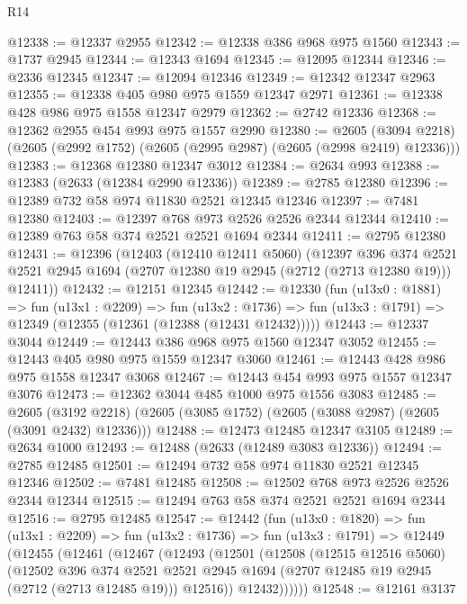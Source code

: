\begin{lexlean}{R14}
\begin{coremodule}
@12338 := @12337 @2955
@12342 := @12338 @386 @968 @975 @1560
@12343 := @1737 @2945
@12344 := @12343 @1694
@12345 := @12095 @12344
@12346 := @2336 @12345
@12347 := @12094 @12346
@12349 := @12342 @12347 @2963
@12355 := @12338 @405 @980 @975 @1559 @12347 @2971
@12361 := @12338 @428 @986 @975 @1558 @12347 @2979
@12362 := @2742 @12336
@12368 := @12362 @2955 @454 @993 @975 @1557 @2990
@12380 := @2605
    (@3094 @2218)
    (@2605 (@2992 @1752) (@2605 (@2995 @2987) (@2605 (@2998 @2419) @12336)))
@12383 := @12368 @12380 @12347 @3012
@12384 := @2634 @993
@12388 := @12383 (@2633 (@12384 @2990 @12336))
@12389 := @2785 @12380
@12396 := @12389 @732 @58 @974 @11830 @2521 @12345 @12346
@12397 := @7481 @12380
@12403 := @12397 @768 @973 @2526 @2526 @2344 @12344
@12410 := @12389 @763 @58 @374 @2521 @2521 @1694 @2344
@12411 := @2795 @12380
@12431 := @12396
    (@12403
      (@12410 @12411 @5060)
      (@12397
        @396
        @374
        @2521
        @2521
        @2945
        @1694
        (@2707 @12380 @19 @2945 (@2712 (@2713 @12380 @19)))
        @12411))
@12432 := @12151 @12345
@12442 := @12330
    (fun (u13x0 : @1881) =>
    fun (u13x1 : @2209) =>
    fun (u13x2 : @1736) => fun (u13x3 : @1791) => @12349 (@12355 (@12361 (@12388 (@12431 @12432)))))
@12443 := @12337 @3044
@12449 := @12443 @386 @968 @975 @1560 @12347 @3052
@12455 := @12443 @405 @980 @975 @1559 @12347 @3060
@12461 := @12443 @428 @986 @975 @1558 @12347 @3068
@12467 := @12443 @454 @993 @975 @1557 @12347 @3076
@12473 := @12362 @3044 @485 @1000 @975 @1556 @3083
@12485 := @2605
    (@3192 @2218)
    (@2605 (@3085 @1752) (@2605 (@3088 @2987) (@2605 (@3091 @2432) @12336)))
@12488 := @12473 @12485 @12347 @3105
@12489 := @2634 @1000
@12493 := @12488 (@2633 (@12489 @3083 @12336))
@12494 := @2785 @12485
@12501 := @12494 @732 @58 @974 @11830 @2521 @12345 @12346
@12502 := @7481 @12485
@12508 := @12502 @768 @973 @2526 @2526 @2344 @12344
@12515 := @12494 @763 @58 @374 @2521 @2521 @1694 @2344
@12516 := @2795 @12485
@12547 := @12442
    (fun (u13x0 : @1820) =>
    fun (u13x1 : @2209) =>
    fun (u13x2 : @1736) =>
    fun (u13x3 : @1791) =>
    @12449
      (@12455
        (@12461
          (@12467
            (@12493
              (@12501
                (@12508
                  (@12515 @12516 @5060)
                  (@12502
                    @396
                    @374
                    @2521
                    @2521
                    @2945
                    @1694
                    (@2707 @12485 @19 @2945 (@2712 (@2713 @12485 @19)))
                    @12516))
                @12432))))))
@12548 := @12161 @3137

\end{coremodule}
\end{lexlean}
